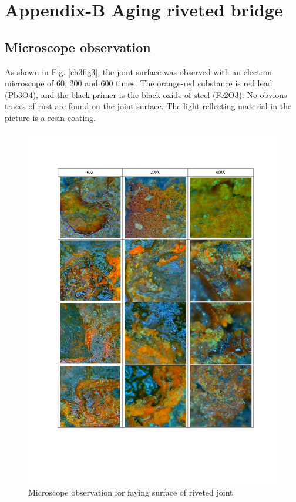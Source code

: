 \chapter{Appendix-B Aging riveted bridge}
\label{app2}
\onehalfspacing


\section{Microscope observation}\label{app-obsur}

As shown in Fig. \ref{ch3fig3}, the joint surface was observed with an electron microscope of 60, 200 and 600 times. The orange-red substance is red lead (Pb3O4), and the black primer is the black oxide of steel (Fe2O3). No obvious traces of rust are found on the joint surface. The light reflecting material in the picture is a resin coating.

\begin{figure}[htbp]
    \centering
    \includegraphics[width=1\linewidth]{imgs//app2/fig-ob-surface.pdf}
    \caption{Microscope observation for faying surface of riveted joint}
    \label{fig-obsur}
\end{figure}


